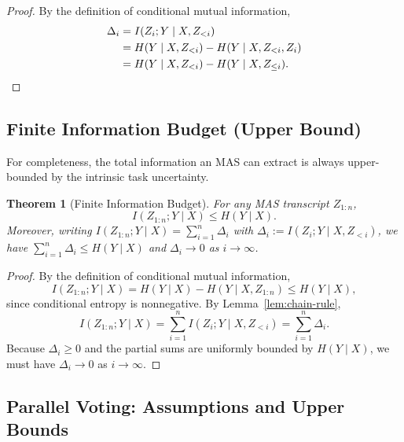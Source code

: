 \documentclass{article}
\theoremstyle{plain}
\newtheorem{theorem}{Theorem}[section]
\theoremstyle{definition}
\theoremstyle{remark}
\begin{document}
\begin{proof}
By the definition of conditional mutual information,
\begin{align}
\Delta_i
&= I(Z_i;Y\mid X,Z_{<i}) \\
&= H(Y\mid X,Z_{<i}) - H(Y\mid X,Z_{<i},Z_i) \\
&= H(Y\mid X,Z_{<i}) - H(Y\mid X,Z_{\le i}).\qedhere
\end{align}
\end{proof}

\subsection{Finite Information Budget (Upper Bound)}
\label{app:budget}


For completeness, the total information an MAS can extract is always upper-bounded by the intrinsic task uncertainty.



\begin{theorem}[Finite Information Budget]
\label{thm:finite_budget_app}
For any MAS transcript $Z_{1:n}$,
\begin{equation}
I(Z_{1:n};Y\mid X)\le H(Y\mid X).
\end{equation}
Moreover, writing $I(Z_{1:n};Y\mid X)=\sum_{i=1}^n \Delta_i$ with $\Delta_i:=I(Z_i;Y\mid X,Z_{<i})$, we have $\sum_{i=1}^n \Delta_i\le H(Y\mid X)$ and $\Delta_i\to 0$ as $i\to\infty$.
\end{theorem}

\begin{proof}
By the definition of conditional mutual information,
\begin{equation}
I(Z_{1:n};Y\mid X)
= H(Y\mid X) - H(Y\mid X,Z_{1:n})
\le H(Y\mid X),
\end{equation}
since conditional entropy is nonnegative.
By Lemma~\ref{lem:chain-rule},
\begin{equation}
I(Z_{1:n};Y\mid X)
= \sum_{i=1}^n I(Z_i;Y\mid X,Z_{<i})
= \sum_{i=1}^n \Delta_i.
\end{equation}
Because $\Delta_i\ge 0$ and the partial sums are uniformly bounded by $H(Y\mid X)$, we must have $\Delta_i\to 0$ as $i\to\infty$.
\end{proof}

\subsection{Parallel Voting: Assumptions and Upper Bounds}
\label{app:parallel}
\end{document}
